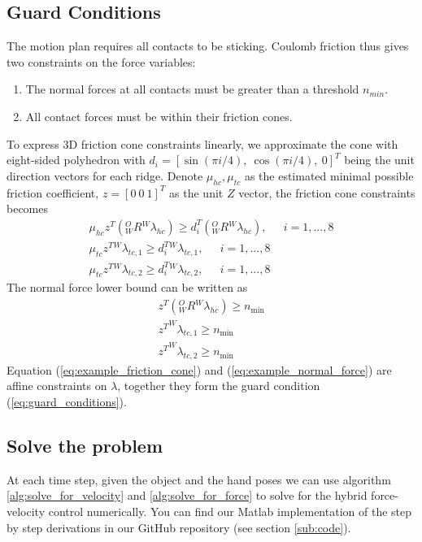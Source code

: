 \subsection{Guard Conditions}
\label{sub:example_guard_conditions}
The motion plan requires all contacts to be sticking. Coulomb friction thus gives two constraints on the force variables:
\begin{enumerate}
	\item The normal forces at all contacts must be greater than a threshold $n_{min}$.
	\item All contact forces must be within their friction cones.
\end{enumerate}
To express 3D friction cone constraints linearly, we approximate the cone with eight-sided polyhedron \cite{trjopt1} with $d_i=[\sin(\pi i/4),\ \cos(\pi i/4),\ 0]^T$ being the unit direction vectors for each ridge. Denote $\mu_{hc}, \mu_{tc}$ as the estimated minimal possible friction coefficient, $z=[0\ 0\ 1]^T$ as the unit $Z$ vector, the friction cone constraints becomes
\begin{equation}
\label{eq:example_friction_cone}
	\begin{array}{l}
{\mu _{hc}}{z^T}(_W^OR{^W\lambda _{hc}}) \ge d_i^T(_W^OR{^W\lambda_{hc}}),\;\;\,\;\;\,i = 1,...,8\\
{\mu _{tc}}{z^T}{^W\lambda _{tc,1}} \ge d_i^T{^W\lambda _{tc,1}},\;\;\,\;\;\,i = 1,...,8\\
{\mu _{tc}}{z^T}{^W\lambda _{tc,2}} \ge d_i^T{^W\lambda _{tc,2}},\;\;\,\;\;\,i = 1,...,8
\end{array}
\end{equation}
The normal force lower bound can be written as
\begin{equation}
\label{eq:example_normal_force}
	\begin{array}{l}
	{z^T}({_W^OR}{^W\lambda _{hc}}) \ge {n_{\min }}\\
	{z^T}^W{\lambda _{tc,1}} \ge {n_{\min }}\\
	{z^T}^W{\lambda _{tc,2}} \ge {n_{\min }}
	\end{array}
\end{equation}
Equation (\ref{eq:example_friction_cone}) and (\ref{eq:example_normal_force}) are affine constraints on $\lambda$, together they form the guard condition (\ref{eq:guard_conditions}).

\subsection{Solve the problem} %
\label{sub:example_solve}
At each time step, given the object and the hand poses we can use algorithm \ref{alg:solve_for_velocity} and \ref{alg:solve_for_force} to solve for the hybrid force-velocity control numerically. You can find our Matlab implementation of the step by step derivations in our GitHub repository (see section \ref{sub:code}).

